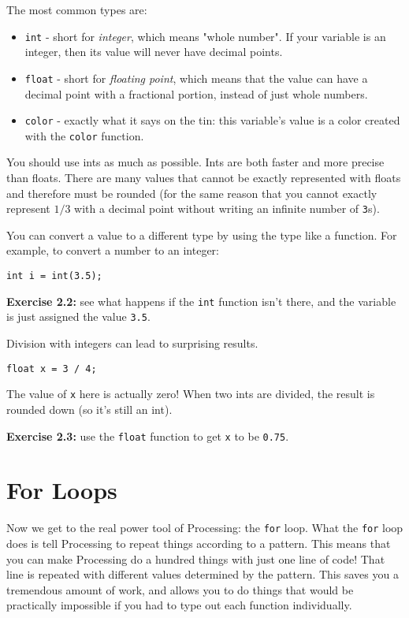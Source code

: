 \documentclass[
]{leaflet}
\begin{document}
The most common types are:
\begin{itemize}
  \item \texttt{int} - short for \textit{integer}, which means "whole number".
    If your variable is an integer, then its value will never have decimal points.

  \item \texttt{float} - short for \textit{floating point}, which means that the value can have a decimal point with a fractional portion, instead of just whole numbers.

  \item \texttt{color} - exactly what it says on the tin: this variable's value is a color created with the \texttt{color} function.
\end{itemize}

You should use ints as much as possible.
Ints are both faster and more precise than floats.
There are many values that cannot be exactly represented with floats and therefore must be rounded (for the same reason that you cannot exactly represent $1/3$ with a decimal point without writing an infinite number of \texttt{3}s).

You can convert a value to a different type by using the type like a function.
For example, to convert a number to an integer:
\begin{lstlisting}
int i = int(3.5);
\end{lstlisting}

\textbf{Exercise 2.2:} see what happens if the \texttt{int} function isn't there, and the variable is just assigned the value \texttt{3.5}.

Division with integers can lead to surprising results.
\begin{lstlisting}
float x = 3 / 4;
\end{lstlisting}
\vspace{-0.5em}
The value of \texttt{x} here is actually zero!
When two ints are divided, the result is rounded down (so it's still an int).

\textbf{Exercise 2.3:} use the \texttt{float} function to get \texttt{x} to be \texttt{0.75}.

\section{For Loops}

Now we get to the real power tool of Processing: the \texttt{for} loop.
What the \texttt{for} loop does is tell Processing to repeat things according to a pattern.
This means that you can make Processing do a hundred things with just one line of code!
That line is repeated with different values determined by the pattern.
This saves you a tremendous amount of work, and allows you to do things that would be practically impossible if you had to type out each function individually.
\end{document}
